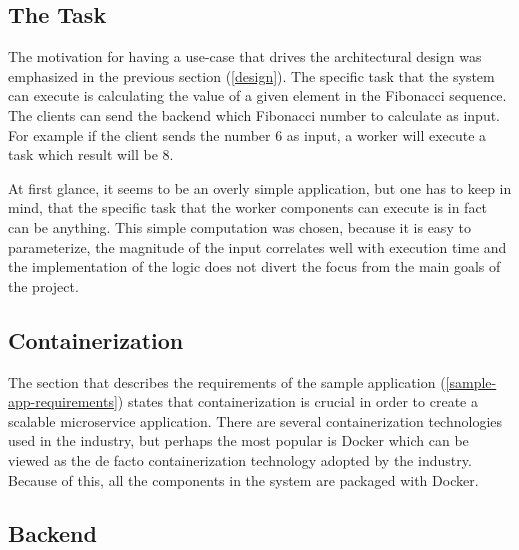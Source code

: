 \subsection{The Task}

The motivation for having a use-case that drives the architectural design was emphasized in the previous section (\ref{design}). The specific task that the system can execute is calculating the value of a given element in the Fibonacci sequence. The clients can send the backend which Fibonacci number to calculate as input. For example if the client sends the number 6 as input, a worker will execute a task which result will be 8.

At first glance, it seems to be an overly simple application, but one has to keep in mind, that the specific task that the worker components can execute is in fact can be anything. This simple computation was chosen, because it is easy to parameterize, the magnitude of the input correlates well with execution time and the implementation of the logic does not divert the focus from the main goals of the project.

\subsection{Containerization}

The section that describes the requirements of the sample application (\ref{sample-app-requirements}) states that containerization is crucial in order to create a scalable microservice application. There are several containerization technologies used in the industry, but perhaps the most popular is Docker \cite{Docker} which can be viewed as the de facto containerization technology adopted by the industry. Because of this, all the components in the system are packaged with Docker.


\subsection{Backend}

